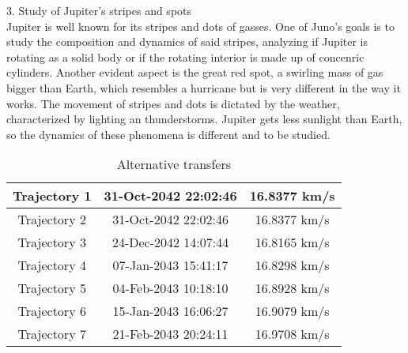 3. Study of Jupiter's stripes and spots\\
Jupiter is well known for its stripes and dots of gasses. One of Juno's goals is to study the composition and dynamics of said stripes, analyzing if Jupiter is rotating as a solid body or if the rotating interior is made up of concenric cylinders. Another evident aspect is the great red spot, a swirling mass of gas bigger than Earth, which resembles a hurricane but is very different in the way it works. The movement of stripes and dots is dictated by the weather, characterized by lighting an thunderstorms. Jupiter gets less sunlight than Earth, so the dynamics of these phenomena is different and to be studied. 


\renewcommand{\arraystretch}{1.5}
\begin{table}[H]
    \centering
    \begin{tabular}{ccc}
      
        Trajectory 1 & 31-Oct-2042 22:02:46 & 16.8377 km/s \\ \hline
        Trajectory 2 & 31-Oct-2042 22:02:46 & 16.8377 km/s \\ \hline
        Trajectory 3 & 24-Dec-2042 14:07:44 & 16.8165 km/s \\ \hline
        Trajectory 4 & 07-Jan-2043 15:41:17 & 16.8298 km/s \\ \hline
        Trajectory 5 & 04-Feb-2043 10:18:10 & 16.8928 km/s \\ \hline
        Trajectory 6 & 15-Jan-2043 16:06:27 & 16.9079 km/s \\ \hline
        Trajectory 7 & 21-Feb-2043 20:24:11 & 16.9708 km/s \\
    \end{tabular}
    \centering
    \caption{Alternative transfers}
    \label{tab:alt_tr}
\end{table}
\renewcommand{\arraystretch}{1}
